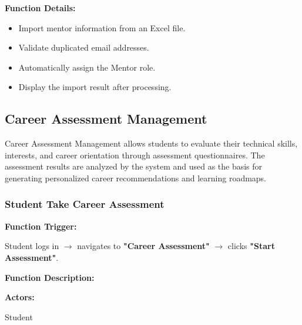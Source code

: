 \vspace{0.3cm}

\textbf{Function Details:}

\begin{itemize}
    \item Import mentor information from an Excel file.

    \item Validate duplicated email addresses.

    \item Automatically assign the Mentor role.

    \item Display the import result after processing.
\end{itemize}


\subsection{Career Assessment Management}

Career Assessment Management allows students to evaluate their technical skills, interests, and career orientation through assessment questionnaires. The assessment results are analyzed by the system and used as the basis for generating personalized career recommendations and learning roadmaps.
\subsubsection{Student Take Career Assessment}

\textbf{Function Trigger:}

Student logs in $\rightarrow$ navigates to \textbf{"Career Assessment"} $\rightarrow$ clicks \textbf{"Start Assessment"}.

\vspace{0.3cm}

\textbf{Function Description:}

\textbf{Actors:}

Student

